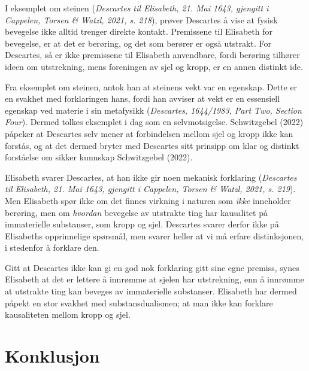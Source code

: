 \documentclass[12pt, a4paper]{article}
\begin{document}
\begin{flushleft}
    I eksemplet om steinen (\textit{Descartes til Elisabeth, 21. Mai 1643, gjengitt i Cappelen, Torsen \& Watzl, 2021, s. 218}), prøver Descartes å vise at fysisk bevegelse ikke alltid trenger direkte kontakt. Premissene til Elisabeth for bevegelse, er at det er berøring, og det som berører er også utstrakt. For Descartes, så er ikke premissene til Elisabeth anvendbare, fordi berøring tilhører ideen om utstrekning, mens foreningen av sjel og kropp, er en annen distinkt ide. 
\end{flushleft}

\begin{flushleft}
    Fra eksemplet om steinen, antok han at steinens vekt var en egenskap. Dette er en svakhet med forklaringen hans, fordi han avviser at vekt er en essensiell egenskap ved materie i sin metafysikk (\textit{Descartes, 1644/1983, Part Two, Section Four}). Dermed tolkes eksemplet i dag som en selvmotsigelse. Schwitzgebel (2022) påpeker at Descartes selv mener at forbindelsen mellom sjel og kropp ikke kan forstås, og at det dermed bryter med Descartes sitt prinsipp om klar og distinkt forståelse om sikker kunnskap Schwitzgebel (2022). 
\end{flushleft}

\begin{flushleft}
    Elisabeth svarer Descartes, at han ikke gir noen mekanisk forklaring (\textit{Descartes til Elisabeth, 21. Mai 1643, gjengitt i Cappelen, Torsen \& Watzl, 2021, s. 219}). Men Elisabeth spør ikke om det finnes virkning i naturen som \textit{ikke} inneholder berøring, men om \textit{hvordan} bevegelse av utstrakte ting har kausalitet på immaterielle substanser, som kropp og sjel. Descartes svarer derfor ikke på Elisabeths opprinnelige spørsmål, men svarer heller at vi må erfare distinksjonen, i stedenfor å forklare den.
\end{flushleft}


\begin{flushleft}
    Gitt at Descartes ikke kan gi en god nok forklaring gitt sine egne premiss, synes Elisabeth at det er lettere å innrømme at sjelen har utstrekning, enn å innrømme at utstrakte ting kan beveges av immaterielle substanser. Elisabeth har dermed påpekt en stor svakhet med substansdualismen; at man ikke kan forklare kausaliteten mellom kropp og sjel. 
\end{flushleft}


\section{Konklusjon}
\end{document}
